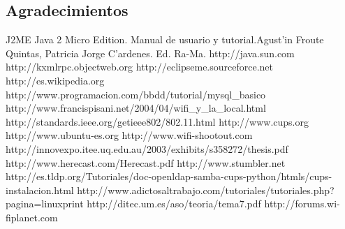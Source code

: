 \documentclass[a4paper]{article}
\begin{document}
\begin{large}
\newpage

\section{Agradecimientos}
	

\newpage	


\begin{thebibliography}{XXX}

	J2ME Java 2 Micro Edition. Manual de usuario y tutorial.Agust'in Froute Quintas, Patricia Jorge C'ardenes. Ed. Ra-Ma.
	http://java.sun.com
	http://kxmlrpc.objectweb.org
	  http://eclipseme.sourceforce.net
	 http://es.wikipedia.org
	http://www.programacion.com/bbdd/tutorial/mysql\_basico
http://www.francispisani.net/2004/04/wifi\_y\_la\_local.html
	http://standards.ieee.org/getieee802/802.11.html
	http://www.cups.org
	http://www.ubuntu-es.org
	http://www.wifi-shootout.com
	http://innovexpo.itee.uq.edu.au/2003/exhibits/s358272/thesis.pdf
	http://www.herecast.com/Herecast.pdf
	http://www.stumbler.net
http://es.tldp.org/Tutoriales/doc-openldap-samba-cups-python/htmls/cups-instalacion.html
http://www.adictosaltrabajo.com/tutoriales/tutoriales.php?pagina=linuxprint
	http://ditec.um.es/aso/teoria/tema7.pdf
	http://forums.wi-fiplanet.com
	
\end{thebibliography}

\end{large}
\end{document}
